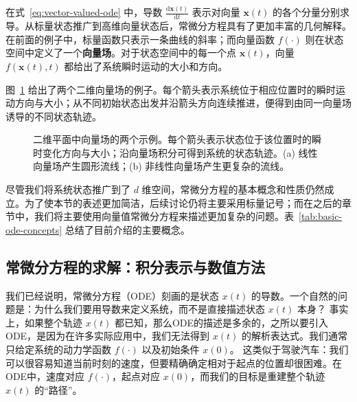 \documentclass[UTF8,a4paper,zihao=-4,oneside,openany]{ctexbook}
\makeatletter
\newcommand{\AMLFigure}[2][0.96\linewidth]{%
  \begingroup
  \let\AtBeginDocument\@gobble
  \endgroup
}
\makeatother
\begin{document}
在式~\eqref{eq:vector-valued-ode} 中，导数 \(\frac{\mathrm{d}\boldsymbol{x}(t)}{\mathrm{d}t}\) 表示对向量 \(\boldsymbol{x}(t)\) 的各个分量分别求导。从标量状态推广到高维向量状态后，常微分方程具有了更加丰富的几何解释。在前面的例子中，标量函数只表示一条曲线的斜率；而向量函数 \(f(\cdot)\) 则在状态空间中定义了一个\textbf{向量场}。对于状态空间中的每一个点 \(\boldsymbol{x}(t)\)，向量 \(f(\boldsymbol{x}(t),t)\) 都给出了系统瞬时运动的大小和方向。

图~\ref{fig:vector-field-examples} 给出了两个二维向量场的例子。每个箭头表示系统位于相应位置时的瞬时运动方向与大小；从不同初始状态出发并沿箭头方向连续推进，便得到由同一向量场诱导的不同状态轨迹。

\begin{figure}[!t]
\centering
\AMLFigure{figure-vector-field-examples}
\caption{二维平面中向量场的两个示例。每个箭头表示状态位于该位置时的瞬时变化方向与大小；沿向量场积分可得到系统的状态轨迹。(a) 线性向量场产生圆形流线；(b) 非线性向量场产生更复杂的流线。}
\label{fig:vector-field-examples}
\end{figure}

尽管我们将系统状态推广到了 \(d\) 维空间，常微分方程的基本概念和性质仍然成立。为了使本节的表述更加简洁，后续讨论仍将主要采用标量记号；而在之后的章节中，我们将主要使用向量值常微分方程来描述更加复杂的问题。表~\ref{tab:basic-ode-concepts} 总结了目前介绍的主要概念。























\subsection{常微分方程的求解：积分表示与数值方法}
我们已经说明，常微分方程（ODE）刻画的是状态 $x(t)$ 的导数。一个自然的问题是：为什么我们要用导数来定义系统，而不是直接描述状态 $x(t)$ 本身？
事实上，如果整个轨迹 $x(t)$ 都已知，那么ODE的描述是多余的，之所以要引入 ODE，是因为在许多实际应用中，我们无法得到 $x(t)$ 的解析表达式。我们通常只给定系统的动力学函数 $f(\cdot)$ 以及初始条件 $x(0)$。
这类似于驾驶汽车：我们可以很容易知道当前时刻的速度，但要精确确定相对于起点的位置却很困难。在ODE中，速度对应 $f(\cdot)$，起点对应 $x(0)$，而我们的目标是重建整个轨迹 $x(t)$ 的“路径”。
\end{document}
